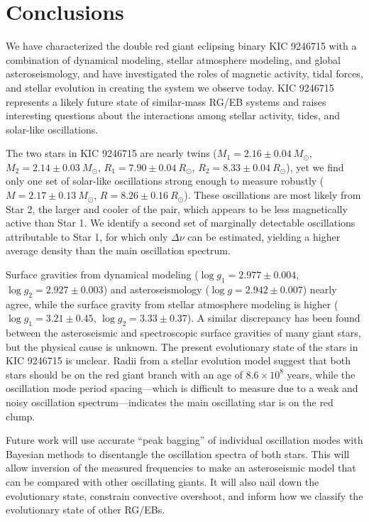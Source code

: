 \section{Conclusions}\label{conclude}


We have characterized the double red giant eclipsing binary KIC 9246715 with a combination of dynamical modeling, stellar atmosphere modeling, and global asteroseismology, and have investigated the roles of magnetic activity, tidal forces, and stellar evolution in creating the system we observe today. KIC 9246715 represents a likely future state of similar-mass RG/EB systems and raises interesting questions about the interactions among stellar activity, tides, and solar-like oscillations.

The two stars in KIC 9246715 are nearly twins ($M_1 = 2.16 \pm 0.04\ M_{\odot}$, $M_2 = 2.14 \pm 0.03\ M_{\odot}$, $R_1 = 7.90 \pm 0.04 \ R_{\odot}$, $R_2 = 8.33 \pm 0.04 \ R_{\odot}$), yet we find only one set of solar-like oscillations strong enough to measure robustly ($M = 2.17 \pm 0.13 \ M_{\odot}$, $R = 8.26 \pm 0.16 \ R_{\odot}$). These oscillations are most likely from Star 2, the larger and cooler of the pair, which appears to be less magnetically active than Star 1. We identify a second set of marginally detectable oscillations attributable to Star 1, for which only $\Delta \nu$ can be estimated, yielding a higher average density than the main oscillation spectrum.

Surface gravities from dynamical modeling ($\log g_1 = 2.977 \pm 0.004$, $\log g_2 = 2.927 \pm 0.003$) and asteroseismology ($\log g = 2.942 \pm 0.007$) nearly agree, while the surface gravity from stellar atmosphere modeling is higher ($\log g_1 = 3.21 \pm 0.45$, $\log g_2 = 3.33 \pm 0.37$). A similar discrepancy has been found between the asteroseismic and spectroscopic surface gravities of many giant stars, but the physical cause is unknown. The present evolutionary state of the stars in KIC 9246715 is unclear. Radii from a stellar evolution model suggest that both stars should be on the red giant branch with an age of $8.6 \times 10^8$ years, while the oscillation mode period spacing---which is difficult to measure due to a weak and noisy oscillation spectrum---indicates the main oscillating star is on the red clump.

Future work will use accurate ``peak bagging'' of individual oscillation modes with Bayesian methods to disentangle the oscillation spectra of both stars. This will allow inversion of the measured frequencies to make an asteroseismic model that can be compared with other oscillating giants. It will also nail down the evolutionary state, constrain convective overshoot, and inform how we classify the evolutionary state of other RG/EBs.

